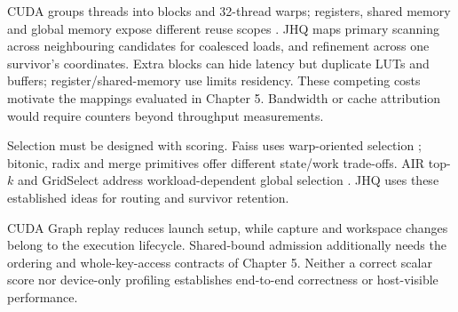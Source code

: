 CUDA groups threads into blocks and 32-thread warps; registers, shared
memory and global memory expose different reuse scopes
\cite{cuda_programming_guide}. JHQ maps primary scanning across neighbouring
candidates for coalesced loads, and refinement across one survivor's
coordinates. Extra blocks can hide latency but duplicate LUTs and buffers;
register/shared-memory use limits residency. These competing costs motivate
the mappings evaluated in Chapter 5. Bandwidth or cache attribution would
require counters beyond throughput measurements.

Selection must be designed with scoring. Faiss uses warp-oriented selection
\cite{johnson_gpu}; bitonic, radix and merge primitives offer different
state/work trade-offs. AIR top-$k$ and GridSelect address workload-dependent
global selection \cite{gpu_topk}. JHQ uses these established ideas for
routing and survivor retention.

CUDA Graph replay reduces launch setup, while capture and workspace changes
belong to the execution lifecycle. Shared-bound admission additionally needs
the ordering and whole-key-access contracts of Chapter 5. Neither a correct
scalar score nor device-only profiling establishes end-to-end correctness
or host-visible performance.
